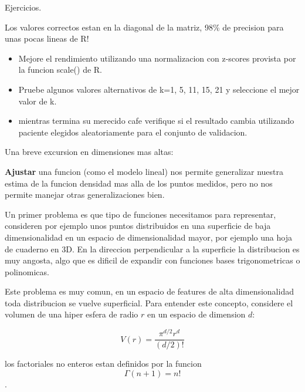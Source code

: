 \documentclass[ignorenonframetext,]{beamer}
\begin{document}
\begin{frame}

\begin{block}{Ejercicios.}

Los valores correctos estan en la diagonal de la matriz, 98\% de
precision para unas pocas lineas de R!

\begin{itemize}
\item
  Mejore el rendimiento utilizando una normalizacion con z-scores
  provista por la funcion scale() de R.
\item
  Pruebe algunos valores alternativos de k=1, 5, 11, 15, 21 y seleccione
  el mejor valor de k.
\item
  mientras termina su merecido cafe verifique si el resultado cambia
  utilizando paciente elegidos aleatoriamente para el conjunto de
  validacion.
\end{itemize}

\end{block}

\end{frame}

\begin{frame}

\end{frame}

\begin{frame}

\begin{block}{Una breve excursion en dimensiones mas altas:}

\textbf{Ajustar} una funcion (como el modelo lineal) nos permite
generalizar nuestra estima de la funcion densidad mas alla de los puntos
medidos, pero no nos permite manejar otras generalizaciones bien.

Un primer problema es que tipo de funciones necesitamos para
representar, consideren por ejemplo unos puntos distribuidos en una
superficie de baja dimensionalidad en un espacio de dimensionalidad
mayor, por ejemplo una hoja de cuaderno en 3D. En la direccion
perpendicular a la superficie la distribucion es muy angosta, algo que
es dificil de expandir con funciones bases trigonometricas o
polinomicas.

Este problema es muy comun, en un espacio de features de alta
dimensionalidad toda distribucion se vuelve superficial. Para entender
este concepto, considere el volumen de una hiper esfera de radio \(r\)
en un espacio de dimension \(d\):

\[V(r)=\frac{\pi^{d/2}r^{d}}{(d/2)!}\]

los factoriales no enteros estan definidos por la funcion
\[\Gamma(n+1)=n!\].

\end{block}

\end{frame}
\end{document}
